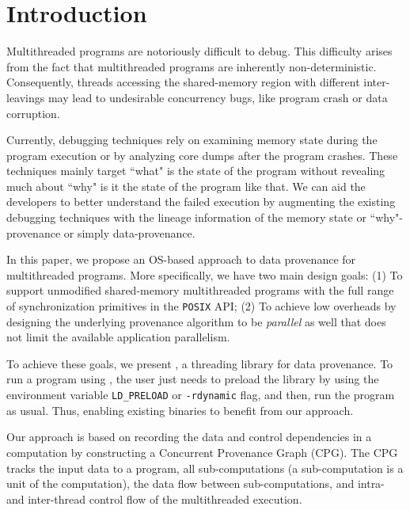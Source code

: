 \section{Introduction}
\label{sec:introduction}

Multithreaded programs are notoriously difficult to debug. This difficulty arises from the fact that multithreaded programs are inherently non-deterministic. Consequently, threads accessing the shared-memory region with different inter-leavings may lead to undesirable concurrency bugs, like program crash or data corruption. 


Currently, debugging techniques rely on examining memory state during the program execution or by analyzing core dumps after the program crashes. These techniques mainly target ``what" is the state of the program without revealing much about ``why" is it the state of the program like that. We can aid the developers to better understand the failed execution by augmenting the existing debugging techniques with the lineage information of the memory state or ``why"-provenance or simply data-provenance.

 



In this paper, we propose an OS-based approach to data provenance for multithreaded programs. More specifically, we have two main design goals: (1) To support unmodified shared-memory multithreaded programs with the full range of synchronization primitives in the {\tt POSIX} API; (2) To achieve low overheads by designing the underlying provenance algorithm to be  {\em parallel} as well that does not limit the available application parallelism.


To achieve these goals, we present \projecttitle, a threading library for data provenance. To run a program using \projecttitle,  the user just needs to preload the \projecttitle library  by using the environment variable {\tt LD\_PRELOAD} or {\tt -rdynamic} flag, and then, run the program as usual. Thus, enabling existing binaries to benefit from our approach. 


Our approach is based on recording the data and control dependencies in a computation by constructing a Concurrent Provenance Graph (CPG). The CPG tracks the input data to a program, all sub-computations (a sub-computation is a unit of the computation), the data flow between sub-computations, and intra- and inter-thread control flow of the multithreaded execution.


